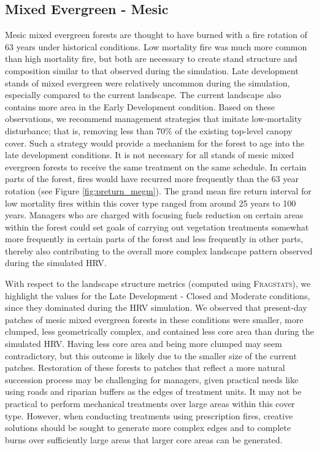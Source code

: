 \subsection{Mixed Evergreen - Mesic}
Mesic mixed evergreen forests are thought to have burned with a fire rotation of 63 years under historical conditions. Low mortality fire was much more common than high mortality fire, but both are necessary to create stand structure and composition similar to that observed during the simulation. Late development stands of mixed evergreen were relatively uncommon during the simulation, especially compared to the current landscape. The current landscape also contains more area in the Early Development condition. Based on these observations, we recommend management strategies that imitate low-mortality disturbance; that is, removing less than 70\% of the existing top-level canopy cover. Such a strategy would provide a mechanism for the forest to age into the late development conditions. It is not necessary for all stands of mesic mixed evergreen forests to receive the same treatment on the same schedule. In certain parts of the forest, fires would have recurred more frequently than the 63 year rotation (see Figure \ref{fig:preturn_megm}). The grand mean fire return interval for low mortality fires within this cover type ranged from around 25 years to 100 years. Managers who are charged with focusing fuels reduction on certain areas within the forest could set goals of carrying out vegetation treatments somewhat more frequently in certain parts of the forest and less frequently in other parts, thereby also contributing to the overall more complex landscape pattern observed during the simulated HRV. 

With respect to the landscape structure metrics (computed using \textsc{Fragstats}), we highlight the values for the Late Development - Closed and Moderate conditions, since they dominated during the HRV simulation. We observed that present-day patches of mesic mixed evergreen forests in these conditions were smaller, more clumped, less geometrically complex, and contained less core area than during the simulated HRV. Having less core area and being more clumped may seem contradictory, but this outcome is likely due to the smaller size of the current patches. Restoration of these forests to patches that reflect a more natural succession process may be challenging for managers, given practical needs like using roads and riparian buffers as the edges of treatment units. It may not be practical to perform mechanical treatments over large areas within this cover type. However, when conducting treatments using prescription fires, creative solutions should be sought to generate more complex edges and to complete burns over sufficiently large areas that larger core areas can be generated.


